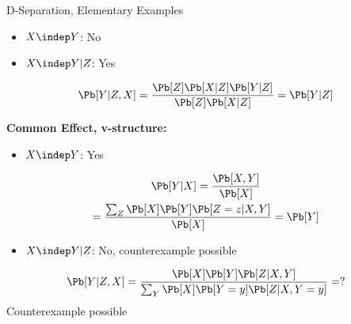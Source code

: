 \begin{frame}{D-Separation, Elementary Examples}
\begin{minipage}[t]{0.47\textwidth}
        \begin{itemize}
        \pause \item $X \indep Y$: \pause No
        \pause \item $X \indep Y | Z$: \pause Yes
        \end{itemize}
        \pause
        \begin{equation}
        \Pb[Y | Z,X] = \frac{\Pb[Z] \Pb[X|Z] \Pb[Y|Z]}{\Pb[Z] \Pb[X|Z]} = \Pb[Y|Z]
        \end{equation}
    \end{minipage}
    \hfill\vrule\hfill
    \begin{minipage}[t]{0.52\textwidth}
\pause \textbf{Common Effect, v-structure:}
        \begin{itemize}
            \pause \item $X \indep Y$: \pause Yes
        \end{itemize}
        \pause
        \begin{multline}
        \Pb[Y | X] = \frac{\Pb[X,Y]}{\Pb[X]} \\ = \frac{\sum_{Z} \Pb[X] \Pb[Y] \Pb[Z=z|X,Y]}{\Pb[X]} = \Pb[Y]
        \end{multline}
        \begin{itemize}
            \pause \item $X \indep Y | Z$: \pause No, counterexample possible
        \end{itemize}
        \pause
        \begin{equation}
        \Pb[Y | Z,X] = \frac{\Pb[X] \Pb[Y] \Pb[Z|X,Y]}{\sum_{Y}\Pb[X] \Pb[Y=y] \Pb[Z|X,Y=y]} = ?
        \end{equation}
        \pause
        Counterexample possible
    \end{minipage}
\end{frame}

